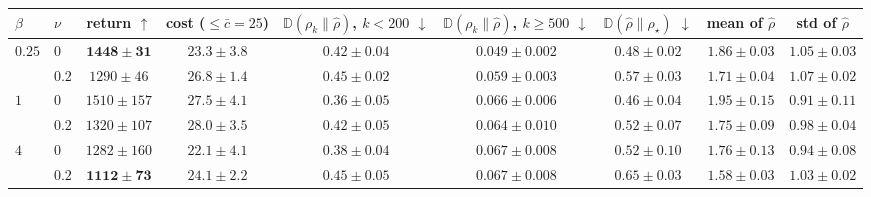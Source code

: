 \begin{tabular}{llccccccc}
\toprule
$\beta$ & $\nu$ & return $\uparrow$ & cost ($\leq\bar{c}=25$) & $\mathbb{D}(\rho_k\|\hat{\rho})$, $k<200$ $\downarrow$ & $\mathbb{D}(\rho_k\|\hat{\rho})$, $k\geq500$ $\downarrow$ & $\mathbb{D}(\hat{\rho}\|\rho_\star)$ $\downarrow$ & mean of $\hat{\rho}$ & std of $\hat{\rho}$ \\
\midrule
$0.25$ & $0$ & $\bm{1448\pm31}$ & $23.3\pm3.8$ & $0.42\pm0.04$ & $\bm{0.049\pm0.002}$ & $0.48\pm0.02$ & $1.86\pm0.03$ & $1.05\pm0.03$ \\
 & $0.2$ & $1290\pm46$ & $26.8\pm1.4$ & $0.45\pm0.02$ & $\bm{0.059\pm0.003}$ & $0.57\pm0.03$ & $1.71\pm0.04$ & $1.07\pm0.02$ \\
$1$ & $0$ & $1510\pm157$ & $27.5\pm4.1$ & $\bm{0.36\pm0.05}$ & $0.066\pm0.006$ & $\bm{0.46\pm0.04}$ & $1.95\pm0.15$ & $0.91\pm0.11$ \\
 & $0.2$ & $1320\pm107$ & $28.0\pm3.5$ & $\bm{0.42\pm0.05}$ & $0.064\pm0.010$ & $\bm{0.52\pm0.07}$ & $1.75\pm0.09$ & $0.98\pm0.04$ \\
$4$ & $0$ & $1282\pm160$ & $22.1\pm4.1$ & $0.38\pm0.04$ & $0.067\pm0.008$ & $0.52\pm0.10$ & $1.76\pm0.13$ & $0.94\pm0.08$ \\
 & $0.2$ & $\bm{1112\pm73}$ & $24.1\pm2.2$ & $0.45\pm0.05$ & $0.067\pm0.008$ & $0.65\pm0.03$ & $1.58\pm0.03$ & $1.03\pm0.02$ \\
\bottomrule
\end{tabular}
